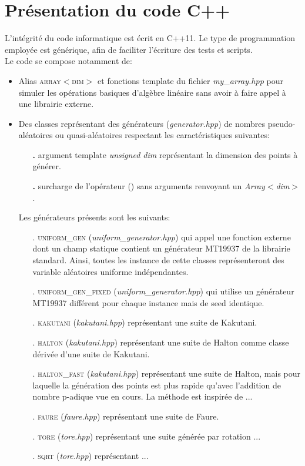 \documentclass[12pt,a4paper]{report}
\newcommand{\source}[1]{\emph{#1}}
\newcommand{\class}[1]{\textsc{#1}}
\begin{document}
\chapter{Présentation du code C++}

L'intégrité du code informatique est écrit en C++11. Le type de programmation employée est générique, afin de faciliter l'écriture des tests et scripts.\\



Le code se compose notamment de:

\begin{itemize}
	\item Alias \class{array$<$dim$>$} et fonctions template du fichier \source{my\_array.hpp} pour simuler les opérations basiques d'algèbre linéaire sans avoir à faire appel à une librairie externe. \\
	
	\item Des classes représentant des générateurs (\source{generator.hpp}) de nombres pseudo-aléatoires ou quasi-aléatoires respectant les caractéristiques suivantes:
	\begin{itemize}
		\item[\Huge\textbf{.}] argument template \textit{unsigned dim} représentant la dimension des points à générer.
		\item[\Huge\textbf{.}] surcharge de l'opérateur () sans arguments renvoyant un \textit{Array$<$dim$>$}.\\
	\end{itemize}
	
	Les générateurs présents sont les suivants:
	\begin{itemize}
		\item[.] \class{uniform\_gen} (\source{uniform\_generator.hpp}) qui appel une fonction externe dont un champ statique contient un générateur MT19937 de la librairie standard. Ainsi, toutes les instance de cette classes représenteront des variable aléatoires uniforme indépendantes.
		\item[.] \class{uniform\_gen\_fixed} (\source{uniform\_generator.hpp}) qui utilise un générateur MT19937 différent pour chaque instance mais de seed identique.
		\item[.] \class{kakutani} (\source{kakutani.hpp}) représentant une suite de Kakutani.
		\item[.] \class{halton} (\source{kakutani.hpp}) représentant une suite de Halton comme classe dérivée d'une suite de Kakutani.
		\item[.] \class{halton\_fast} (\source{kakutani.hpp}) représentant une suite de Halton, mais pour laquelle la génération des points est plus rapide qu'avec l'addition de nombre p-adique vue en cours. La méthode est inspirée de ...
		\item[.] \class{faure} (\source{faure.hpp}) représentant une suite de Faure.
		\item[.] \class{tore} (\source{tore.hpp}) représentant une suite générée par rotation ... 
		\item[.] \class{sqrt} (\source{tore.hpp}) représentant ...\\
	\end{itemize}
	

\end{itemize}
\end{document}
